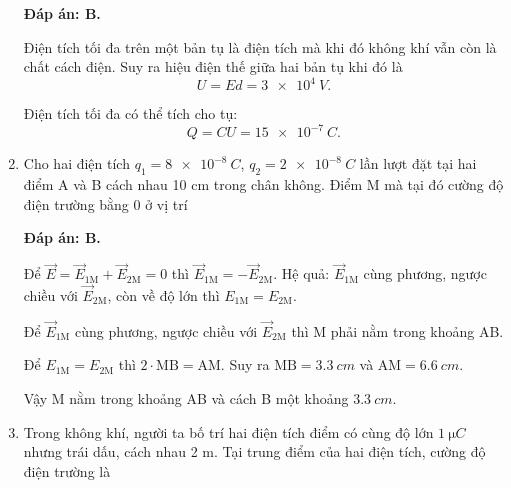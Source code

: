 \begin{enumerate}[label=\bfseries Câu \arabic*:]
{	}
	\loigiai
	{	\textbf{Đáp án: B.}
		
		Điện tích tối đa trên một bản tụ là điện tích mà khi đó không khí vẫn còn là chất cách điện. Suy ra hiệu điện thế giữa hai bản tụ khi đó là
		$$U=Ed = \SI{3e4}{V}.$$
		
		Điện tích tối đa có thể tích cho tụ:
		$$Q=CU = \SI{15e-7}{C}.$$
	}
	\item {}
	
	\cauhoi
	{Cho hai điện tích $q_1=\SI{8e-8}{C}$, $q_2=\SI{2e-8}{C}$ lần lượt đặt tại hai điểm A và B cách nhau 10 cm trong chân không. Điểm M mà tại đó cường độ điện trường bằng 0 ở vị trí
		
	}
	\loigiai
	{	\textbf{Đáp án: B.}
		
		Để $\vec E = \vec E_\text{1M} + \vec E_\text{2M} = 0$ thì $\vec E_\text{1M} = -\vec E_\text{2M}$. Hệ quả: $\vec E_\text{1M}$ cùng phương, ngược chiều với $\vec E_\text{2M}$, còn về độ lớn thì $E_\text{1M} = E_\text{2M}$.
		
		Để $\vec E_\text{1M}$ cùng phương, ngược chiều với $\vec E_\text{2M}$ thì M phải nằm trong khoảng AB.
		
		Để $E_\text{1M} = E_\text{2M}$ thì $2\cdot \text{MB} = \text{AM}$. Suy ra $\text{MB} = \SI{3.3}{cm}$ và $\text{AM} = \SI{6.6}{cm}$.
		
		Vậy M nằm trong khoảng AB và cách B một khoảng $\SI{3.3}{cm}$.
	}
	\item {}
	
	\cauhoi
	{Trong không khí, người ta bố trí hai điện tích điểm có cùng độ lớn $\SI{1}{\micro C}$ nhưng trái dấu, cách nhau 2 m. Tại trung điểm của hai điện tích, cường độ điện trường là
		
}
\end{enumerate}
